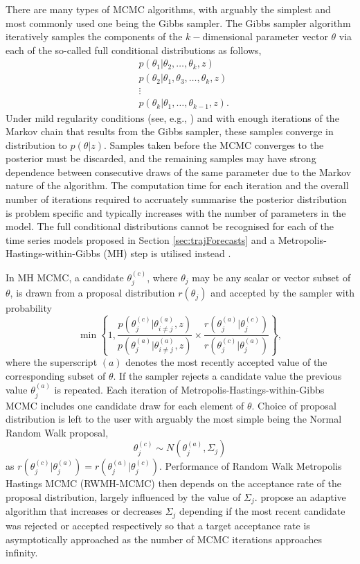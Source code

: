 \documentclass[12pt,a4paper]{article}\usepackage[]{graphicx}\usepackage[]{color}
\begin{document}
There are many types of MCMC algorithms, with arguably the simplest and most commonly used one being the Gibbs sampler. The Gibbs sampler algorithm iteratively samples the components of the $k-$dimensional parameter vector $\theta$ via each of the so-called full conditional distributions as follows,
\begin{align}
&p(\theta_1 | \theta_2, \dots, \theta_k, z) \nonumber \\
&p(\theta_2 | \theta_1, \theta_3, \dots, \theta_k, z) \nonumber \\
&\vdots \nonumber \\
&p(\theta_k | \theta_1, \dots, \theta_{k-1}, z). \nonumber
\end{align}
Under mild regularity conditions (see, e.g., \citet{Tierney1994}) and with enough iterations of the Markov chain that results from the Gibbs sampler, these samples converge in distribution to $p(\theta | z)$. Samples taken before the MCMC converges to the posterior must be discarded, and the remaining samples may have strong dependence between consecutive draws of the same parameter due to the Markov nature of the algorithm. The computation time for each iteration and the overall number of iterations required to accruately summarise the posterior distribution is problem specific and typically increases with the number of parameters in the model. The full conditional distributions cannot be recognised for each of the time series models proposed in Section \ref{sec:trajForecasts} and a Metropolis-Hastings-within-Gibbs (MH) step is utilised instead \citep{Gilks1995}.

In MH MCMC, a candidate $\theta_j^{(c)}$, where $\theta_j$ may be any scalar or vector subset of $\theta$, is drawn from a proposal distribution $r(\theta_j)$ and accepted by the sampler with probability
\begin{equation}
\min \left\{ 1, \frac{p(\theta_j^{(c)} | \theta_{i \neq j}^{(a)}, z)}{p(\theta_j^{(a)} | \theta_{i \neq j}^{(a)}, z)} \times \frac{r(\theta_j^{(a)} | \theta_j^{(c)})}{r(\theta_j^{(c)} | \theta_j^{(a)})} \right\},
\label{MHaccept}
\end{equation}
where the superscript $(a)$ denotes the most recently accepted value of the corresponding subset of $\theta$. If the sampler rejects a candidate value the previous value $\theta_j^{(a)}$ is repeated. Each iteration of Metropolis-Hastings-within-Gibbs MCMC includes one candidate draw for each element of $\theta$. Choice of proposal distribution is left to the user with arguably the most simple being the Normal Random Walk proposal,
\begin{equation}
\theta_j^{(c)} \sim N(\theta_j^{(a)}, \Sigma_j)
\label{RWprop}
\end{equation}
as $r(\theta_j^{(c)} | \theta_j^{(a)}) = r(\theta_j^{(a)} | \theta_j^{(c)})$. Performance of Random Walk Metropolis Hastings MCMC (RWMH-MCMC) then depends on the acceptance rate of the proposal distribution, largely influenced by the value of $\Sigma_j$. \citet{Garthwaite2016} propose an adaptive algorithm that increases or decreases $\Sigma_j$ depending if the most recent candidate was rejected or accepted respectively so that a target acceptance rate is asymptotically approached as the number of MCMC iterations approaches infinity.
\end{document}
